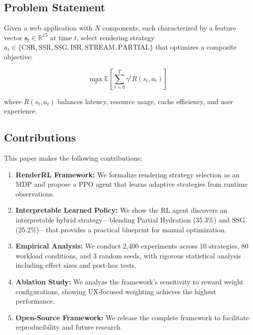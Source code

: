 \documentclass[10pt,twocolumn]{article}
\newcommand{\method}{RenderRL}
\newcommand{\reals}{\mathbb{R}}
\begin{document}
\subsection{Problem Statement}

Given a web application with $N$ components, each characterized by a feature vector $\mathbf{s}_t \in \reals^{15}$ at time $t$, select rendering strategy $a_t \in \{\text{CSR}, \text{SSR}, \text{SSG}, \text{ISR}, \text{STREAM}, \text{PARTIAL}\}$ that optimizes a composite objective:

\begin{equation}
\max_{\pi} \mathbb{E}\left[\sum_{t=0}^{T} \gamma^t R(s_t, a_t)\right]
\end{equation}

where $R(s_t, a_t)$ balances latency, resource usage, cache efficiency, and user experience.

\subsection{Contributions}

This paper makes the following contributions:

\begin{enumerate}[nosep]
\item \textbf{\method{} Framework:} We formalize rendering strategy selection as an MDP and propose a PPO agent that learns adaptive strategies from runtime observations.

\item \textbf{Interpretable Learned Policy:} We show the RL agent discovers an interpretable hybrid strategy---blending Partial Hydration (35.3\%) and SSG (25.2\%)---that provides a practical blueprint for manual optimization.

\item \textbf{Empirical Analysis:} We conduct 2,400 experiments across 10 strategies, 80 workload conditions, and 3 random seeds, with rigorous statistical analysis including effect sizes and post-hoc tests.

\item \textbf{Ablation Study:} We analyze the framework's sensitivity to reward weight configurations, showing UX-focused weighting achieves the highest performance.

\item \textbf{Open-Source Framework:} We release the complete framework to facilitate reproducibility and future research.
\end{enumerate}
\end{document}
